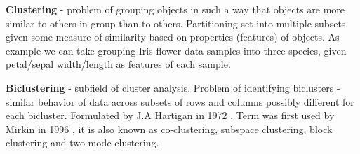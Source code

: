 \textbf{Clustering} - problem of grouping objects in such a way that objects are more similar to others in group than to others. Partitioning set into multiple subsets given some measure of similarity based on properties (features) of objects.
As example we can take grouping Iris flower data samples into three species, given petal/sepal width/length as features of each sample. 

\textbf{Biclustering} - subfield of cluster analysis. Problem of identifying biclusters - similar behavior of data across subsets of rows and columns possibly different for each bicluster. 
Formulated by J.A Hartigan in 1972 \cite{hartigan1972direct}. Term was first used by Mirkin in 1996 \cite{mirkin1998mathematical}, it is also known as co-clustering, subspace clustering, block clustering and two-mode clustering.

